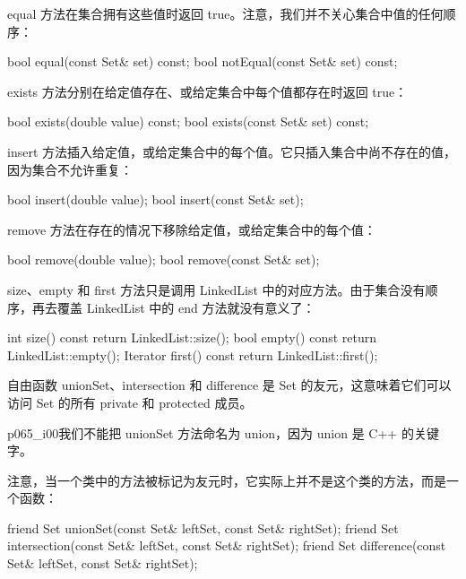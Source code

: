 equal 方法在集合拥有这些值时返回 true。注意，我们并不关心集合中值的任何顺序：

\begin{codebox}
    bool equal(const Set& set) const;
    bool notEqual(const Set& set) const;
\end{codebox}

exists 方法分别在给定值存在、或给定集合中每个值都存在时返回 true：

\begin{codebox}
    bool exists(double value) const;
    bool exists(const Set& set) const;
\end{codebox}

insert 方法插入给定值，或给定集合中的每个值。它只插入集合中尚不存在的值，因为集合不允许重复：

\begin{codebox}
    bool insert(double value);
    bool insert(const Set& set);
\end{codebox}

remove 方法在存在的情况下移除给定值，或给定集合中的每个值：

\begin{codebox}
    bool remove(double value);
    bool remove(const Set& set);
\end{codebox}

size、empty 和 first 方法只是调用 LinkedList 中的对应方法。由于集合没有顺序，再去覆盖 LinkedList 中的 end 方法就没有意义了：

\begin{codebox}
    int size() const { return LinkedList::size(); }
    bool empty() const { return LinkedList::empty(); }
    Iterator first() const { return LinkedList::first(); }
\end{codebox}

自由函数 unionSet、intersection 和 difference 是 Set 的友元，这意味着它们可以访问 Set 的所有 private 和 protected 成员。

\begin{myNotic}{p065_i00}{我们不能把 unionSet 方法命名为 union，因为 union 是 C++ 的关键字。}
\end{myNotic}

注意，当一个类中的方法被标记为友元时，它实际上并不是这个类的方法，而是一个函数：

\begin{codebox}
    friend Set unionSet(const Set& leftSet, const Set& rightSet);
    friend Set intersection(const Set& leftSet,
                            const Set& rightSet);
    friend Set difference(const Set& leftSet,
                          const Set& rightSet);
\end{codebox}

